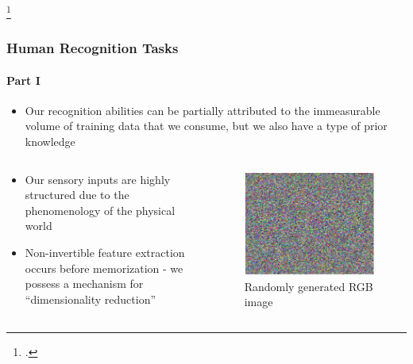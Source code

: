 \documentclass[aspectratio=169,usenames,dvipsnames]{beamer}
\begin{document}
\begin{frame}
\begin{columns}[T]
\begin{column}{.5\linewidth}
\end{column}

\end{columns}
\vspace{0.75em}
\centering
{}

\footcitetext{kay-det}


\end{frame}








\begin{frame}
\frametitle{Human Recognition Tasks}
\framesubtitle{Part I}

\begin{itemize}
\item Our recognition abilities can be partially attributed to the immeasurable volume of \alert{training data} that we consume, but we also have a type of \alert{prior knowledge}
\end{itemize}


\begin{columns}[c]

\hspace{2ex}
\begin{column}{.5\linewidth}

\begin{itemize}
\item Our sensory inputs are highly structured due to the phenomenology of the physical world
\vspace{1em}
\item Non-invertible feature extraction occurs before memorization - we possess a mechanism for ``dimensionality reduction''
\end{itemize}

\end{column}




\begin{column}{.5\linewidth}

\begin{figure}
\centering
\includegraphics[width=0.7\linewidth]{RGB_random.pdf}
\caption{Randomly generated RGB image}
\label{fig:RGB_random}
\end{figure}


\end{column}
\end{columns}
\end{frame}
\end{document}

